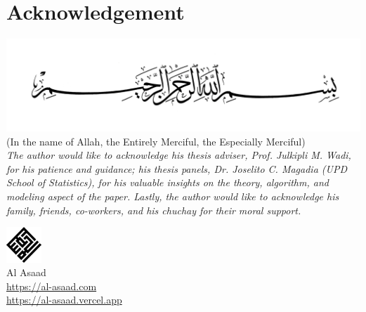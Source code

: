 \chapter*{Acknowledgement}
{\centering
\includegraphics[scale = 1]{img/bismillah.jpg}\\[-.3cm]
(In the name of Allah, the Entirely Merciful, the Especially Merciful)\\[3cm]
}
\textit{The author would like to acknowledge his thesis adviser, Prof. Julkipli M. Wadi, for his patience and guidance; his thesis panels, Dr. Joselito C. Magadia (UPD School of Statistics), for his valuable insights on the theory, algorithm, and modeling aspect of the paper. Lastly, the author would like to acknowledge his family, friends, co-workers, and his chuchay for their moral support.}\\[2cm]
\begin{center}
    \includegraphics[width=0.1\textwidth]{img/alasaad-logo.png}\\
    Al Asaad\\
    \url{https://al-asaad.com}\\[-0.3cm]
    \url{https://al-asaad.vercel.app}
\end{center}